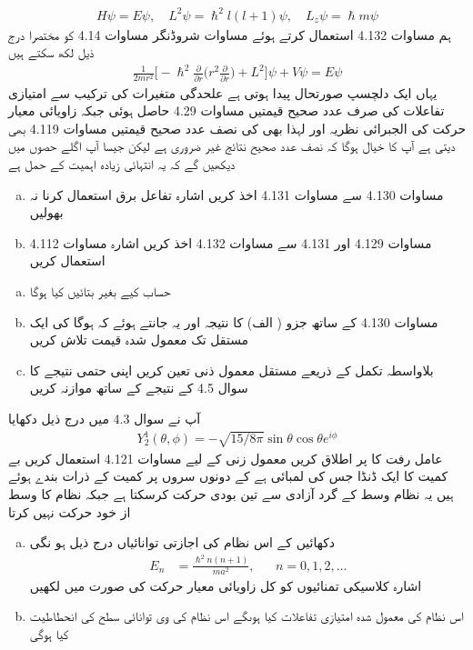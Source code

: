 \begin{align}
H \psi = E \psi , \quad L^2 \psi = \hslash^2 l (l + 1) \psi , \quad L_z \psi = \hslash m \psi
\end{align}
ہم مساوات 4.132 استعمال کرتے ہوئے مساوات شروڈنگر مساوات 4.14 کو مختصرا درج ذیل لکھ سکتے ہیں 
\begin{align*}
\frac{1}{2m r^2} \big [ - \hslash^2 \frac{\partial}{\partial r} \big ( r^2 \frac{\partial}{\partial r} \big ) + L^2 \big ]  \psi + V \psi = E \psi
\end{align*}
یہاں ایک دلچسپ صورتحال پیدا ہوتی ہے علحدگی متغیرات کی ترکیب سے امتیازی تفاعلات کی صرف عدد صحیح  قیمتیں مساوات 4.29 حاصل ہوئی جبکہ زاویائی معیار حرکت کی الجبرائی نظریہ  اور لہذا  بھی کی نصف عدد صحیح قیمتیں مساوات 4.119 بھی دیتی ہے آپ کا خیال ہوگا کہ نصف عدد صحیح نتائج غیر ضروری ہے لیکن جیسا آپ اگلے حصوں میں دیکھیں گے کہ یہ انتہائی زیادہ اہمیت کے حمل ہے 
\begin{enumerate}[a.]
\item
مساوات 4.130 سے مساوات 4.131 اخذ کریں اشارہ تفاعل برق استعمال کرنا نہ بھولیں 
\item
مساوات 4.129 اور 4.131 سے مساوات 4.132 اخذ کریں اشارہ مساوات 4.112 استعمال کریں 
\end{enumerate}
\begin{enumerate}[a.]
\item
حساب کیے بغیر بتائیں  کیا ہوگا 
\item
مساوات 4.130 کے ساتھ جزو ( الف) کا نتیجہ اور یہ جانتے ہوئے کہ  ہوگا  کی ایک مستقل تک معمول شدہ قیمت تلاش کریں 
\item
بلاواسطہ تکمل کے ذریعے مستقل معمول ذنی تعین کریں اپنی حتمی نتیجے کا سوال 4.5 کے نتیجے کے ساتھ موازنہ کریں 
\end{enumerate} 
آپ نے سوال 4.3 میں درج ذیل دکھایا 
\begin{align*} 
Y_2^1 (\theta , \phi) = - \sqrt{15/8 \pi} \sin \theta \cos \theta e^{i \phi}
\end{align*}
عامل رفت کا  پر اطلاق کریں معمول زنی کے لیے مساوات 4.121 استعمال کریں 
بے کمیت کا ایک ڈنڈا جس کی لمبائی  ہے کے دونوں سروں پر کمیت   کے ذرات بندے ہوئے ہیں يہ نظام وسط کے گرد آزادی سے تین بودی حرکت کرسکتا ہے جبکہ نظام کا وسط از  خود حرکت نہیں کرتا 
\begin{enumerate}[a.]
\item
دکھائیں کے اس نظام کی اجازتی توانائیاں درج ذیل ہو نگی 
\begin{align*}
E_n& = \frac{\hslash^2 n (n + 1)}{m a^2} ,&& n=0,1,2,\dotsc 
\end{align*}
اشارہ کلاسیکی تمنائیوں کو کل زاویائی معیار حرکت کی صورت میں لکھیں 
\item
اس نظام کی معمول شدہ امتیازی تفاعلات کیا ہوںگے اس نظام کی  وی توانائی سطح کی انحطاطیت کیا ہوگی 
\end{enumerate}

